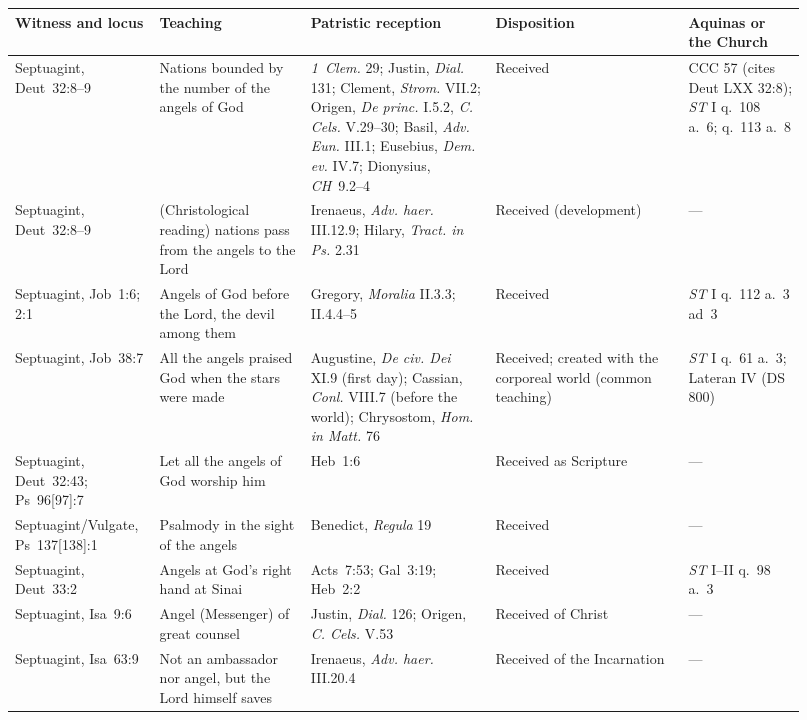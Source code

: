\begin{longtable}{>{\raggedright\arraybackslash}p{0.15\linewidth}>{\raggedright\arraybackslash}p{0.18\linewidth}>{\raggedright\arraybackslash}p{0.22\linewidth}>{\raggedright\arraybackslash}p{0.23\linewidth}>{\raggedright\arraybackslash}p{0.14\linewidth}}
\toprule
\textbf{Witness and locus} & \textbf{Teaching} & \textbf{Patristic reception} & \textbf{Disposition} & \textbf{Aquinas or the Church}\\
\midrule
\endhead
\bottomrule
\endfoot
Septuagint, Deut~32:8--9 & Nations bounded by the number of the angels of God & \emph{1~Clem.} 29; Justin, \emph{Dial.} 131; Clement, \emph{Strom.} VII.2; Origen, \emph{De princ.} I.5.2, \emph{C. Cels.} V.29--30; Basil, \emph{Adv. Eun.} III.1; Eusebius, \emph{Dem. ev.} IV.7; Dionysius, \emph{CH}~9.2--4 & Received & CCC 57 (cites Deut LXX 32:8); \emph{ST} I q.~108 a.~6; q.~113 a.~8\\
Septuagint, Deut~32:8--9 & (Christological reading) nations pass from the angels to the Lord & Irenaeus, \emph{Adv. haer.} III.12.9; Hilary, \emph{Tract. in Ps.} 2.31 & Received (development) & ---\\
Septuagint, Job~1:6; 2:1 & Angels of God before the Lord, the devil among them & Gregory, \emph{Moralia} II.3.3; II.4.4--5 & Received & \emph{ST} I q.~112 a.~3 ad~3\\
Septuagint, Job~38:7 & All the angels praised God when the stars were made & Augustine, \emph{De civ. Dei} XI.9 (first day); Cassian, \emph{Conl.} VIII.7 (before the world); Chrysostom, \emph{Hom. in Matt.} 76 & Received; created with the corporeal world (common teaching) & \emph{ST} I q.~61 a.~3; Lateran IV (DS 800)\\
Septuagint, Deut~32:43; Ps~96[97]:7 & Let all the angels of God worship him & Heb~1:6 & Received as Scripture & ---\\
Septuagint/\allowbreak{}Vulgate, Ps~137[138]:1 & Psalmody in the sight of the angels & Benedict, \emph{Regula} 19 & Received & ---\\
Septuagint, Deut~33:2 & Angels at God's right hand at Sinai & Acts~7:53; Gal~3:19; Heb~2:2 & Received & \emph{ST} I--II q.~98 a.~3\\
Septuagint, Isa~9:6 & Angel (Messenger) of great counsel & Justin, \emph{Dial.} 126; Origen, \emph{C. Cels.} V.53 & Received of Christ & ---\\
Septuagint, Isa~63:9 & Not an ambassador nor angel, but the Lord himself saves & Irenaeus, \emph{Adv. haer.} III.20.4 & Received of the Incarnation & ---\\

\end{longtable}
